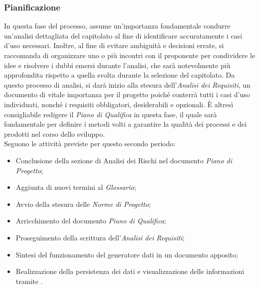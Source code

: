\subsubsection{Pianificazione}
In questa fase del processo, assume un'importanza fondamentale condurre un'analisi dettagliata del capitolato al fine di identificare accuratamente i casi d'uso necessari. Inoltre, al fine di evitare ambiguità e decisioni errate, si raccomanda di organizzare uno o più incontri con il proponente per condividere le idee e risolvere i dubbi emersi durante l'analisi, che sarà notevolmente più approfondita rispetto a quella svolta durante la selezione del capitolato. Da questo processo di analisi, si darà inizio alla stesura dell'\textit{Analisi dei Requisiti}, un documento di vitale importanza per il progetto poiché conterrà tutti i casi d'uso individuati, nonché i requisiti obbligatori, desiderabili e opzionali.
È altresì consigliabile redigere il \textit{Piano di Qualifica} in questa fase, il quale sarà fondamentale per definire i metodi volti a garantire la qualità dei processi e dei prodotti nel corso dello sviluppo. \\ Seguono le attività previste per questo secondo periodo:
\begin{itemize}
\setlength{\itemsep}{0em}
    \item Conclusione della sezione di Analisi dei Rischi nel documento \textit{Piano di Progetto};
    \item Aggiunta di nuovi termini al \textit{Glossario};
    \item Avvio della stesura delle \textit{Norme di Progetto};
    \item Arricchimento del documento \textit{Piano di Qualifica};
    \item Proseguimento della scrittura dell'\textit{Analisi dei Requisiti};
    \item Sintesi del funzionamento del generatore dati in un documento apposito;
    \item Realizzazione della persistenza dei dati e visualizzazione delle informazioni tramite .
\end{itemize}

